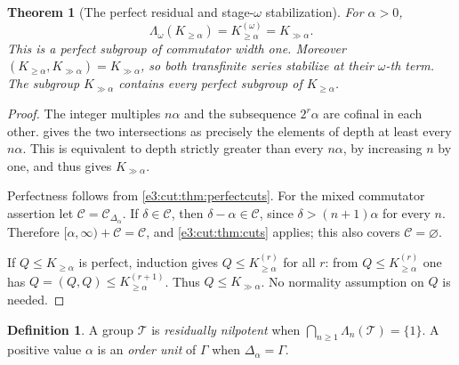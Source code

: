 \documentclass[11pt,letterpaper]{article}
\numberwithin{equation}{section}
\newtheorem{theorem}{Theorem}[section]
\theoremstyle{definition}
\newtheorem{definition}[definition]{Definition}
\theoremstyle{remark}
\newcommand{\comm}[2]{\left(#1,#2\right)}
\begin{document}
\begin{theorem}[The perfect residual and stage-$\omega$ stabilization]\label{e3:cut:thm:residual}
For $\alpha>0$,
\begin{equation}\label{e3:cut:eq:residual}
 \Lambda_\omega(K_{\ge\alpha})=K_{\ge\alpha}^{(\omega)}=K_{\gg\alpha}.
\end{equation}
This is a perfect subgroup of commutator width one. Moreover
$\comm{K_{\ge\alpha}}{K_{\gg\alpha}}=K_{\gg\alpha}$, so both transfinite series
stabilize at their $\omega$-th term. The subgroup $K_{\gg\alpha}$ contains every
perfect subgroup of $K_{\ge\alpha}$.
\end{theorem}
\begin{proof}
The integer multiples $n\alpha$ and the subsequence $2^r\alpha$ are cofinal in
each other.  gives the two intersections as precisely the
elements of depth at least every $n\alpha$. This is equivalent to depth
strictly greater than every $n\alpha$, by increasing $n$ by one, and thus gives
$K_{\gg\alpha}$.

Perfectness follows from \cref{e3:cut:thm:perfectcuts}. For the mixed
commutator assertion let $\mathcal C=\mathcal C_{\Delta_\alpha}$. If
$\delta\in\mathcal C$, then $\delta-\alpha\in\mathcal C$, since
$\delta>(n+1)\alpha$ for every $n$. Therefore
$[\alpha,\infty)+\mathcal C=\mathcal C$, and \cref{e3:cut:thm:cuts} applies;
this also covers $\mathcal C=\varnothing$.

If $Q\le K_{\ge\alpha}$ is perfect, induction gives $Q\le K_{\ge\alpha}^{(r)}$
for all $r$: from $Q\le K_{\ge\alpha}^{(r)}$ one has
$Q=\comm QQ\le K_{\ge\alpha}^{(r+1)}$. Thus $Q\le K_{\gg\alpha}$. No normality
assumption on $Q$ is needed.
\end{proof}

\begin{definition}\label{e3:cut:def:rn}
A group $\mathcal T$ is \emph{residually nilpotent} when
$\bigcap_{n\ge1}\Lambda_n(\mathcal T)=\{1\}$. A positive value $\alpha$ is an
\emph{order unit} of $\Gamma$ when $\Delta_\alpha=\Gamma$.
\end{definition}
\end{document}
